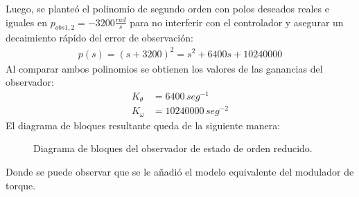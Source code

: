 \documentclass[a4paper, 10pt, onecolumn,journal]{ieeeconf}
\begin{document}
Luego, se planteó el polinomio de segundo orden con polos deseados reales e iguales en $p_{obs1,2} = -3200 \frac{rad}{s}$ para no interferir con el controlador y asegurar un decaimiento rápido del error de observación:
\begin{align}
	p(s) = \left( s + 3200\right) ^2 = s^2 + 6400 s + 10240000\label{polinomeo caracteristico de observador deseado}
\end{align}
Al comparar ambos polinomios se obtienen los valores de las ganancias del observador:
\begin{align}
	K_{\theta} &= 6400 \, seg^{-1}\label{ganacia de posicion de observador}\\
	K_{\omega} &= 10240000 \, seg^{-2}\label{ganacia de velocidad de observador}
\end{align}
El diagrama de bloques resultante queda de la siguiente manera:
\begin{figure}[H]
	\centering
	\begin{adjustbox}{max width=\columnwidth,scale=0.8}
	\end{adjustbox}
	\caption{Diagrama de bloques del observador de estado de orden reducido.}
	\label{Diagrama de bloques del observador de estado de orden reducido}
\end{figure}
Donde se puede observar que se le añadió el modelo equivalente del modulador de torque.
\end{document}
